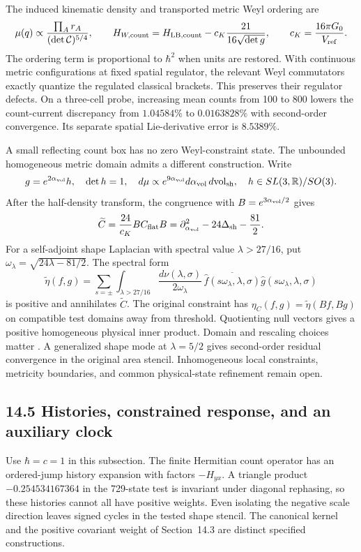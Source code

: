 \documentclass[11pt]{article}
\begin{document}
The induced kinematic density and transported metric Weyl ordering are
\[
\mu(q)\propto\frac{\prod_A r_A}{(\det\mathcal C)^{5/4}},\qquad
H_{W,{\rm count}}=H_{{\rm LB},{\rm count}}
-c_K\frac{21}{16\sqrt{\det g}},
\qquad c_K=\frac{16\pi G_0}{V_{\rm ref}}.
\]
The ordering term is proportional to \(\hbar^2\) when units are
restored. With continuous metric configurations at fixed spatial
regulator, the relevant Weyl commutators exactly quantize the
regulated classical brackets. This preserves their regulator
defects. On a three-cell probe, increasing mean counts from
100 to 800 lowers the count-current discrepancy from \(1.04584\%\)
to \(0.0163828\%\) with second-order convergence. Its separate
spatial Lie-derivative error is \(8.5389\%\).

A small reflecting count box has no zero Weyl-constraint state.
The unbounded homogeneous metric domain admits a different
construction. Write
\[
g=e^{2\alpha_{\rm vol}}h,\quad\det h=1,\quad
d\mu\propto e^{9\alpha_{\rm vol}}d\alpha_{\rm vol}\,d{\rm vol}_{\rm sh},
\quad h\in SL(3,\mathbb R)/SO(3).
\]
After the half-density transform, the congruence with
\(B=e^{3\alpha_{\rm vol}/2}\) gives
\[
\widetilde C=\frac{24}{c_K}BC_{\rm flat}B
=\partial_{\alpha_{\rm vol}}^2-24\Delta_{\rm sh}-\frac{81}{2}.
\]
For a self-adjoint shape Laplacian with spectral value
\(\lambda>27/16\), put \(\omega_\lambda=\sqrt{24\lambda-81/2}\).
The spectral form
\[
\widetilde\eta(f,g)=
\sum_{s=\pm}\int_{\lambda>27/16}\frac{d\nu(\lambda,\sigma)}
{2\omega_\lambda}\,
\overline{\widehat f(s\omega_\lambda,\lambda,\sigma)}
\widehat g(s\omega_\lambda,\lambda,\sigma)
\]
is positive and annihilates \(\widetilde C\).
The original constraint has
\(\eta_C(f,g)=\widetilde\eta(Bf,Bg)\) on compatible test domains
away from threshold. Quotienting null vectors gives a positive
homogeneous physical inner product. Domain and rescaling choices
matter \citep{AQGLouko2011}. A generalized shape mode at
\(\lambda=5/2\) gives second-order residual convergence in the
original area stencil. Inhomogeneous local constraints, metricity
boundaries, and common physical-state refinement remain open.

\subsection{14.5 Histories, constrained response, and an auxiliary clock}

Use \(\hbar=c=1\) in this subsection.
The finite Hermitian count operator has an ordered-jump history
expansion with factors \(-H_{yx}\). A triangle product
\(-0.254534167364\) in the 729-state test is invariant under
diagonal rephasing, so these histories cannot all have positive
weights. Even isolating the negative scale direction leaves
signed cycles in the tested shape stencil.
The canonical kernel and the positive covariant weight of
Section~14.3 are distinct specified constructions.
\end{document}

